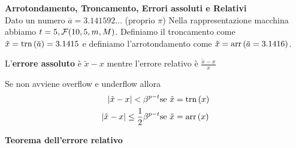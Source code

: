 

\begin{defn}
    \textbf{Arrotondamento, Troncamento, Errori assoluti e Relativi} \\
    Dato un numero $\overbar{a} = 3.141592\hdots$ (proprio $\pi$)
    Nella rappresentazione macchina abbiamo $t = 5, \mathcal{F}(10,5,m,M)$.
    Definiamo il troncamento come
    $\tilde{x} = \trn{\overbar{a}} = 3.1415$ e definiamo
    l'arrotondamento come $\tilde{x} = \arr{\overbar{a} = 3.1416}$.

    L'\textbf{errore assoluto} è $\tilde{x} - x$ mentre l'errore relativo è $\frac{\tilde{x} - x}{x}$
\end{defn}


\begin{lem}
    Se non avviene overflow e underflow allora
    \begin{eqnarray*}
        \lvert\tilde{x} - x\rvert < \beta^{p-t} & \text{se } \tilde{x} = \text{trn}\left(x\right) \\
        \lvert\tilde{x} - x\rvert \leq \frac{1}{2} \beta^{p-t} & \text{se } \tilde{x} = \text{arr}\left(x\right)
    \end{eqnarray*}
\end{lem}

\begin{defn}
    \textbf{Teorema dell'errore relativo} \\
    
\end{defn}
